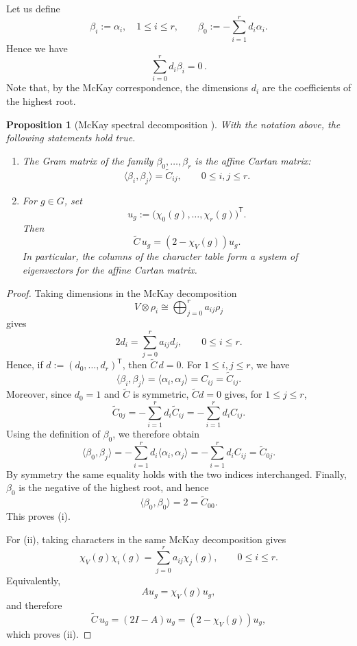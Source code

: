\documentclass[a4paper,reqno]{amsart}
\theoremstyle{plain} %
\newtheorem{prop}[thm]{Proposition}
\theoremstyle{definition} %
\theoremstyle{remark} %
\newcommand{\1}{\mathds{1}}   %
\begin{document}
Let us define
\[
\beta_i :=\alpha_i,\quad 1\leq i\leq r,
\qquad
\beta_0 :=-\sum_{i=1}^r d_i\alpha_i.
\]
Hence we have
\begin{equation}\label{affine-dimension-relation}
\sum_{i=0}^r d_i \beta_i =0 \, .
\end{equation}
Note that, by the McKay correspondence, the dimensions \(d_i\) are the coefficients of the highest root. 



\begin{prop}[McKay spectral decomposition {\cite{McKay}}]\label{prop:mckay-spectral}
\label{prop:mckay-spectral}
With the notation above, the following statements hold true.
\begin{enumerate}
    \item[(i)] The Gram matrix of the family
    $\beta_0,\ldots,\beta_r$ is the affine Cartan matrix:
    \[
        \langle\beta_i,\beta_j\rangle=\widetilde C_{ij},
        \qquad 0\leq i,j\leq r.
    \]

    \item[(ii)] For $g\in G$, set
    \[
        u_g:=\bigl(\chi_0(g),\ldots,\chi_r(g)\bigr)^\mathsf{T}.
    \]
    Then
\begin{equation}\label{mckay-eigenvector}
\widetilde C\,u_g=(2-\chi_V(g))u_g.
\end{equation}
    In particular, the columns of the character table form a system of
    eigenvectors for the affine Cartan matrix.
\end{enumerate}
\end{prop}

\begin{proof}
Taking dimensions in the McKay decomposition
\[
    V\otimes\rho_i\cong\bigoplus_{j=0}^r a_{ij}\rho_j
\]
gives
\[
    2d_i=\sum_{j=0}^r a_{ij}d_j,
    \qquad 0\leq i\leq r.
\]
Hence, if $d:=(d_0,\ldots,d_r)^\mathsf T$, then $\widetilde C\,d=0$. 
For $1\leq i,j\leq r$, we have
\[
    \langle\beta_i,\beta_j\rangle
    =\langle\alpha_i,\alpha_j\rangle
    =C_{ij}
    =\widetilde C_{ij}.
\]
Moreover, since $d_0=1$ and $\widetilde C$ is symmetric,
$\widetilde C d=0$ gives, for $1\leq j\leq r$,
\[
    \widetilde C_{0j}
    =-\sum_{i=1}^r d_i\widetilde C_{ij}
    =-\sum_{i=1}^r d_i C_{ij}.
\]
Using the definition of $\beta_0$, we therefore obtain
\[
    \langle\beta_0,\beta_j\rangle
    =
    -\sum_{i=1}^r d_i\langle\alpha_i,\alpha_j\rangle
    =
    -\sum_{i=1}^r d_i C_{ij}
    =
    \widetilde C_{0j}.
\]
By symmetry the same equality holds with the two indices interchanged.
Finally, $\beta_0$ is the negative of the highest root, and hence
\[
    \langle\beta_0,\beta_0\rangle=2=\widetilde C_{00}.
\]
This proves (i).

For (ii), taking characters in the same McKay decomposition gives
\[
    \chi_V(g)\chi_i(g)
    =
    \sum_{j=0}^r a_{ij}\chi_j(g),
    \qquad 0\leq i\leq r.
\]
Equivalently,
\[
    A u_g=\chi_V(g)u_g,
\]
and therefore
\[
    \widetilde C\,u_g
    =(2I-A)u_g
    =(2-\chi_V(g))u_g,
\]
which proves (ii).
\end{proof}
\end{document}
